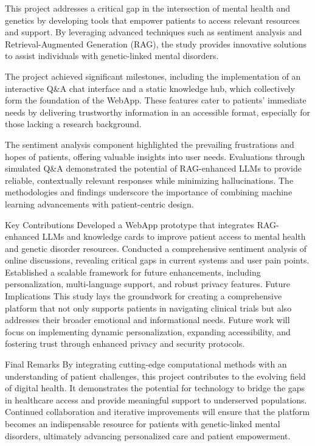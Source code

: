 \documentclass{article} %
\begin{document}
This project addresses a critical gap in the intersection of mental health and genetics by developing tools that empower patients to access relevant resources and support. By leveraging advanced techniques such as sentiment analysis and Retrieval-Augmented Generation (RAG), the study provides innovative solutions to assist individuals with genetic-linked mental disorders.

The project achieved significant milestones, including the implementation of an interactive Q&A chat interface and a static knowledge hub, which collectively form the foundation of the WebApp. These features cater to patients' immediate needs by delivering trustworthy information in an accessible format, especially for those lacking a research background.

The sentiment analysis component highlighted the prevailing frustrations and hopes of patients, offering valuable insights into user needs. Evaluations through simulated Q&A demonstrated the potential of RAG-enhanced LLMs to provide reliable, contextually relevant responses while minimizing hallucinations. The methodologies and findings underscore the importance of combining machine learning advancements with patient-centric design.

Key Contributions
Developed a WebApp prototype that integrates RAG-enhanced LLMs and knowledge cards to improve patient access to mental health and genetic disorder resources.
Conducted a comprehensive sentiment analysis of online discussions, revealing critical gaps in current systems and user pain points.
Established a scalable framework for future enhancements, including personalization, multi-language support, and robust privacy features.
Future Implications
This study lays the groundwork for creating a comprehensive platform that not only supports patients in navigating clinical trials but also addresses their broader emotional and informational needs. Future work will focus on implementing dynamic personalization, expanding accessibility, and fostering trust through enhanced privacy and security protocols.

Final Remarks
By integrating cutting-edge computational methods with an understanding of patient challenges, this project contributes to the evolving field of digital health. It demonstrates the potential for technology to bridge the gaps in healthcare access and provide meaningful support to underserved populations. Continued collaboration and iterative improvements will ensure that the platform becomes an indispensable resource for patients with genetic-linked mental disorders, ultimately advancing personalized care and patient empowerment.
\end{document}
